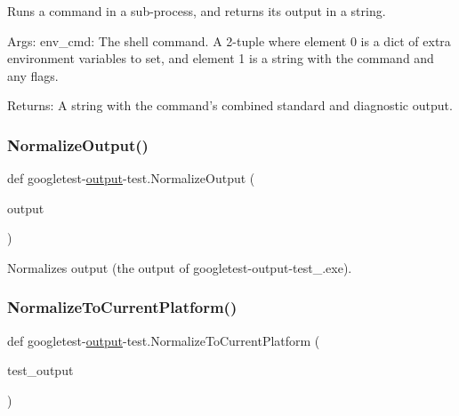 \begin{DoxyVerb}Runs a command in a sub-process, and returns its output in a string.

Args:
  env_cmd: The shell command. A 2-tuple where element 0 is a dict of extra
           environment variables to set, and element 1 is a string with
           the command and any flags.

Returns:
  A string with the command's combined standard and diagnostic output.
\end{DoxyVerb}
 \mbox{\label{namespacegoogletest-output-test_a34d8f4f0f5714a846af7a576fca906ea}} 
\subsubsection{\texorpdfstring{NormalizeOutput()}{NormalizeOutput()}}
{\footnotesize\ttfamily def googletest-\/\mbox{\hyperlink{namespacegoogletest-output-test_ab3df9ce09186215a36c30454cf282417}{output}}-\/test.\+Normalize\+Output (\begin{DoxyParamCaption}\item[{}]{output }\end{DoxyParamCaption})}

\begin{DoxyVerb}Normalizes output (the output of googletest-output-test_.exe).\end{DoxyVerb}
 \mbox{\label{namespacegoogletest-output-test_a6641ac66a197c6d17b38e5ed3f9bf92e}} 
\subsubsection{\texorpdfstring{NormalizeToCurrentPlatform()}{NormalizeToCurrentPlatform()}}
{\footnotesize\ttfamily def googletest-\/\mbox{\hyperlink{namespacegoogletest-output-test_ab3df9ce09186215a36c30454cf282417}{output}}-\/test.\+Normalize\+To\+Current\+Platform (\begin{DoxyParamCaption}\item[{}]{test\+\_\+output }\end{DoxyParamCaption})}

